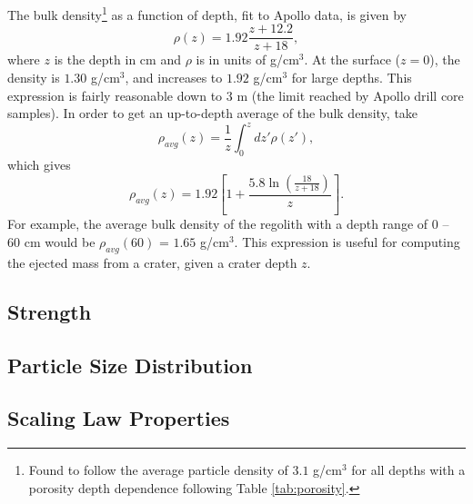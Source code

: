 \documentclass{article}
\begin{document}
The bulk density\footnote{Found to follow the average particle density of $3.1$ g/cm$^3$ for all depths with a porosity depth dependence following Table \ref{tab:porosity}.} as a function of depth, fit to Apollo data, is given by
\begin{equation}
\rho(z) = 1.92\frac{z+12.2}{z+18},
\end{equation}
where $z$ is the depth in cm and $\rho$ is in units of g/cm$^3$. At the surface ($z=0$), the density is $1.30$ g/cm$^3$, and increases to $1.92$ g/cm$^3$ for large depths. This expression is fairly reasonable down to $3$ m (the limit reached by Apollo drill core samples). In order to get an up-to-depth average of the bulk density, take
\begin{equation}
\rho_{avg}(z) = \frac{1}{z}\int_{0}^{z}dz'\rho(z'), 
\end{equation}
which gives
\begin{equation}
\rho_{avg}(z) = 1.92\left[1 + \frac{5.8\ln\left(\frac{18}{z + 18}\right)}{z}\right].
\end{equation}
For example, the average bulk density of the regolith with a depth range of $0$ -- $60$ cm would be $\rho_{avg}(60)$ = $1.65$ g/cm$^3$. This expression is useful for computing the ejected mass from a crater, given a crater depth $z$.


\subsection{Strength}


\subsection{Particle Size Distribution}


\subsection{Scaling Law Properties}
\end{document}
